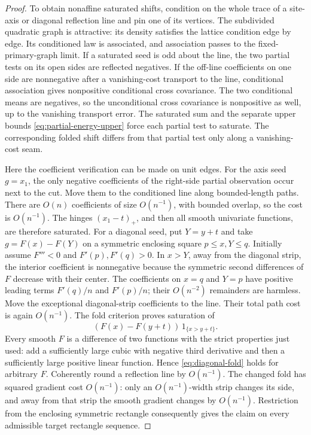 \begin{proof}
To obtain nonaffine saturated shifts, condition on the whole trace
of a site-axis or diagonal reflection line and pin one of its
vertices. The subdivided quadratic graph is attractive:
its density satisfies the lattice condition edge by edge.
Its conditioned law is associated, and association passes to the
fixed-primary-graph limit. If a saturated seed is odd about the
line, the two partial tests on its open sides are reflected
negatives. If the off-line coefficients on one side are
nonnegative after a vanishing-cost transport to the line,
conditional association gives nonpositive conditional cross
covariance. The two conditional means are negatives, so the
unconditional cross covariance is nonpositive as well, up to the
vanishing transport error. The saturated sum and the separate
upper bounds \eqref{eq:partial-energy-upper} force each partial
test to saturate. The corresponding folded shift differs from
that partial test only along a vanishing-cost seam.

Here the coefficient verification can be made on unit edges.
For the axis seed \(g=x_1\), the only negative coefficients of the
right-side partial observation occur next to the cut. Move them
to the conditioned line along bounded-length paths. There are
\(O(n)\) coefficients of size \(O(n^{-1})\), with bounded overlap,
so the cost is \(O(n^{-1})\).
The hinges \((x_1-t)_+\), and then all smooth univariate functions,
are therefore saturated.
For a diagonal seed, put \(Y=y+t\) and take
\(g=F(x)-F(Y)\) on a symmetric enclosing square
\(p\le x,Y\le q\). Initially assume \(F'''<0\) and
\(F'(p),F'(q)>0\). In \(x>Y\), away from the diagonal strip,
the interior coefficient is nonnegative because the symmetric
second differences of \(F\) decrease with their center.
The coefficients on \(x=q\) and \(Y=p\) have positive leading
terms \(F'(q)/n\) and \(F'(p)/n\); their \(O(n^{-2})\)
remainders are harmless. Move the exceptional diagonal-strip
coefficients to the line. Their total path cost is again
\(O(n^{-1})\). The fold criterion proves saturation of
\begin{equation}
 (F(x)-F(y+t))\,1_{\{x>y+t\}}.
 \label{eq:diagonal-fold}
\end{equation}
Every smooth \(F\) is a difference of two functions with the strict
properties just used: add a sufficiently large cubic with negative
third derivative and then a sufficiently large positive linear
function. Hence \eqref{eq:diagonal-fold} holds for arbitrary \(F\).
Coherently round a reflection line by \(O(n^{-1})\).
The changed fold has squared gradient cost \(O(n^{-1})\):
only an \(O(n^{-1})\)-width strip changes its side, and away from
that strip the smooth gradient changes by \(O(n^{-1})\).
Restriction from the enclosing symmetric rectangle consequently
gives the claim on every admissible target rectangle sequence.


\end{proof}
